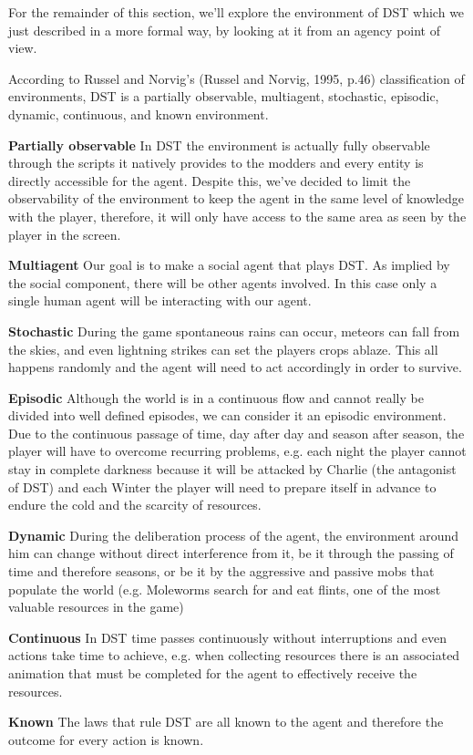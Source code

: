 For the remainder of this section, we'll explore the environment of \ac{DST} which we just described in a more formal way, by looking at it from an agency point of view.

According to Russel and Norvig's (Russel and Norvig, 1995, p.46) classification of environments, \ac{DST} is a partially observable, multiagent, stochastic, episodic, dynamic, continuous, and known environment.

\begin{description}
	\item \textbf{Partially observable} In \ac{DST} the environment is actually fully observable through the scripts it natively provides to the modders and every entity is directly accessible for the agent. Despite this, we've decided to limit the observability of the environment to keep the agent in the same level of knowledge with the player, therefore, it will only have access to the same area as seen by the player in the screen.
	\item \textbf{Multiagent} Our goal is to make a social agent that plays \ac{DST}.
	As implied by the social component, there will be other agents involved. 
	In this case only a single human agent will be interacting with our agent.
	\item \textbf{Stochastic} During the game spontaneous rains can occur, meteors can fall from the skies, and even lightning strikes can set the players crops ablaze. 
	This all happens randomly and the agent will need to act accordingly in order to survive.
	\item \textbf{Episodic} Although the world is in a continuous flow and cannot really be divided into well defined episodes, we can consider it an episodic environment. 
	Due to the continuous passage of time, day after day and season after season, the player will have to overcome recurring problems, e.g. each night the player cannot stay in complete darkness because it will be attacked by Charlie (the antagonist of \ac{DST}) and each Winter the player will need to prepare itself in advance to endure the cold and the scarcity of resources.
	\item \textbf{Dynamic} During the deliberation process of the agent, the environment around him can change without direct interference from it, be it through the passing of time and therefore seasons, or be it by the aggressive and passive mobs that populate the world (e.g. Moleworms search for and eat flints, one of the most valuable resources in the game)
	\item \textbf{Continuous} In \ac{DST} time passes continuously without interruptions and even actions take time to achieve, e.g. when collecting resources there is an associated animation that must be completed for the agent to effectively receive the resources.
	\item \textbf{Known} The laws that rule \ac{DST} are all known to the agent and therefore the outcome for every action is known.
\end{description}

